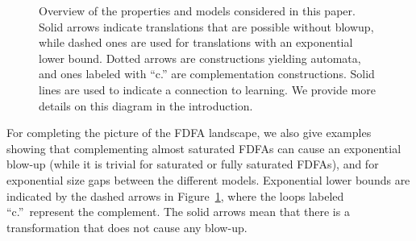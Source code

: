 \documentclass[a4paper,USenglish,cleveref,autoref,thm-restate]{lipics-v2021}
\newcommand{\PSPACE}{\textsf{PSPACE}\xspace}
\newcommand{\PTIME}{\textsf{PTIME}\xspace}
\begin{document}
\begin{figure}
\begin{center}
    \caption{Overview of the properties and models considered in this paper. 
    Solid arrows indicate translations that are possible without blowup, while dashed ones are used for translations with an exponential lower bound.
    Dotted arrows are constructions yielding automata, and ones labeled with ``c.'' are complementation constructions.
    Solid lines are used to indicate a connection to learning.
    We provide more details on this diagram in the introduction.}
\label{fig:overview}
    \end{center}
\end{figure} 
For completing the picture of the FDFA landscape, we also give examples showing that complementing almost saturated FDFAs can cause an exponential blow-up (while it is trivial for saturated or fully saturated FDFAs), and for exponential size gaps between the different models. Exponential lower bounds are indicated by the dashed arrows in Figure~\ref{fig:overview}, where the loops labeled ``c.''~represent the complement. The solid arrows mean that there is a transformation that does not cause any blow-up. 
\end{document}
